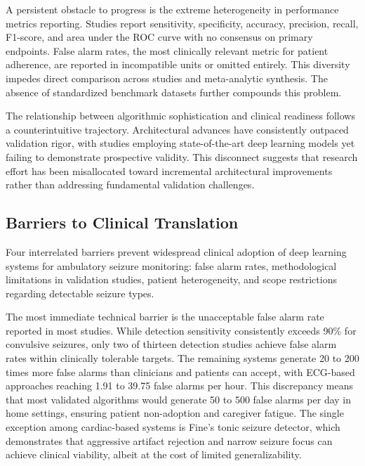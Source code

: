 A persistent obstacle to progress is the extreme heterogeneity in performance metrics reporting. Studies report sensitivity, specificity, accuracy, precision, recall, F1-score, and area under the ROC curve with no consensus on primary endpoints. False alarm rates, the most clinically relevant metric for patient adherence, are reported in incompatible units or omitted entirely. This diversity impedes direct comparison across studies and meta-analytic synthesis. The absence of standardized benchmark datasets further compounds this problem.

The relationship between algorithmic sophistication and clinical readiness follows a counterintuitive trajectory. Architectural advances have consistently outpaced validation rigor, with studies employing state-of-the-art deep learning models yet failing to demonstrate prospective validity. This disconnect suggests that research effort has been misallocated toward incremental architectural improvements rather than addressing fundamental validation challenges.

\subsection{Barriers to Clinical Translation}

Four interrelated barriers prevent widespread clinical adoption of deep learning systems for ambulatory seizure monitoring: false alarm rates, methodological limitations in validation studies, patient heterogeneity, and scope restrictions regarding detectable seizure types.

The most immediate technical barrier is the unacceptable false alarm rate reported in most studies. While detection sensitivity consistently exceeds 90\% for convulsive seizures, only two of thirteen detection studies achieve false alarm rates within clinically tolerable targets. The remaining systems generate 20 to 200 times more false alarms than clinicians and patients can accept, with ECG-based approaches reaching 1.91 to 39.75 false alarms per hour. This discrepancy means that most validated algorithms would generate 50 to 500 false alarms per day in home settings, ensuring patient non-adoption and caregiver fatigue. The single exception among cardiac-based systems is Fine's tonic seizure detector, which demonstrates that aggressive artifact rejection and narrow seizure focus can achieve clinical viability, albeit at the cost of limited generalizability.

